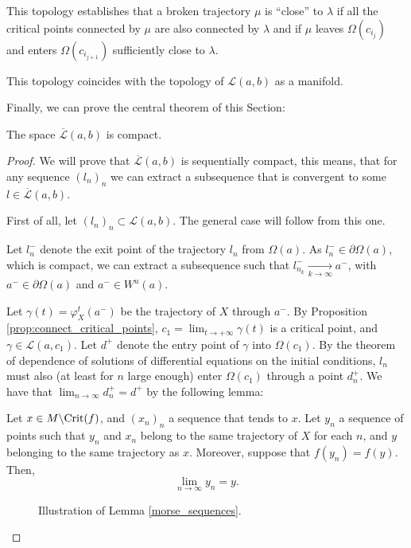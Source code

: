 This topology establishes that a broken trajectory $\mu$ is “close” to $\lambda$ if all the critical points connected by $\mu$ are also connected by $\lambda$ and if $\mu$ leaves $\Omega(c_{i_j})$ and enters $\Omega(c_{i_{j+1}})$ sufficiently close to $\lambda$.

\begin{rmrk}
This topology coincides with the topology of $\mathcal{L}(a,b)$ as a manifold.
\end{rmrk}

Finally, we can prove the central theorem of this Section:

\begin{theo}
The space $\overline{\mathcal{L}}(a,b)$ is compact.
\end{theo}

\begin{proof}
We will prove that $\overline{\mathcal{L}}(a,b)$ is sequentially compact, this means, that for any sequence $(l_n)_n$ we can extract a subsequence that is convergent to some $l \in \overline{\mathcal{L}}(a,b)$.

First of all, let $(l_n)_n \subset \mathcal{L}(a,b)$. The general case will follow from this one.

Let $l_n^{-}$ denote the exit point of the trajectory $l_n$ from $\Omega(a)$. As $l_n^- \in \partial \Omega(a)$, which is compact, we can extract a subsequence such that $l_{n_k}^- \xrightarrow[k \rightarrow \infty]{} a^-$, with $a^- \in \partial \Omega(a)$ and $a^- \in W^u(a)$.

Let $\gamma(t) = \varphi^t_X(a^-)$ be the trajectory of $X$ through $a^-$. By Proposition \ref{prop:connect_critical_points}, $c_1 = \displaystyle\lim_{t \rightarrow +\infty} \gamma(t)$ is a critical point, and $\gamma \in \mathcal{L}(a,c_1)$. Let $d^+$ denote the entry point of $\gamma$ into $\Omega(c_1)$. By the theorem of dependence of solutions of differential equations on the initial conditions, $l_n$ must also (at least for $n$ large enough) enter $\Omega(c_1)$ through a point $d_n^+$. We have that $\displaystyle\lim_{n \rightarrow \infty} d_n^+ = d^+$ by the following lemma:

\begin{lema} \label{morse_sequences}
Let $x \in M \backslash \mathrm{Crit}(f)$, and $(x_n)_n$ a sequence that tends to $x$. Let $y_n$ a sequence of points such that $y_n$ and $x_n$ belong to the same trajectory of $X$ for each $n$, and $y$ belonging to the same trajectory as $x$. Moreover, suppose that $f(y_n) = f(y)$. Then,
\[\lim_{n \rightarrow \infty} y_n = y .\]
\begin{figure}[h] \label{figure:morse_sequences}
	\centering
	
	\caption{Illustration of Lemma \ref{morse_sequences}.}
\end{figure}
\end{lema}


\end{proof}
